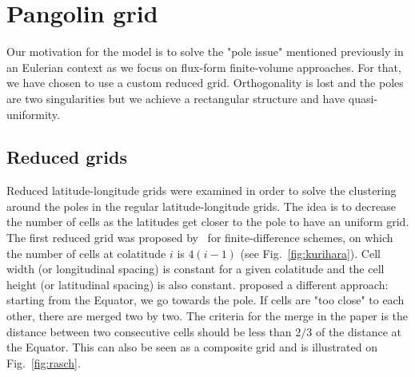 \section{Pangolin grid}
\label{subsec:pango_grid}
Our motivation for the model is to solve the "pole issue" mentioned previously
in an Eulerian context as we focus on flux-form finite-volume approaches. For
that, we have chosen to use a custom reduced grid. Orthogonality is lost and
the poles are two singularities but we achieve a rectangular structure and have
quasi-uniformity.

\subsection{Reduced grids}
Reduced latitude-longitude grids were examined in order to solve the clustering
around the poles in the regular latitude-longitude grids. The idea is to
decrease the number of cells as the latitudes get closer to the pole to
have an uniform grid. The first reduced grid was proposed by~\cite{Kurihara1965}
for finite-difference schemes, on which the number of cells at colatitude $i$ is
$4(i-1)$ (see Fig.~\ref{fig:kurihara}). Cell width (or longitudinal spacing) is
constant for a given colatitude and the cell height (or latitudinal spacing) is
also constant. \cite{Rasch1994} proposed a different approach: starting from the
Equator, we go towards the pole. If cells are "too close" to each other, there
are merged two by two. The criteria for the merge in the paper is the distance
between two consecutive cells should be less than $2/3$ of the distance at the
Equator. This can also be seen as a composite grid and is illustrated on
Fig.~\ref{fig:rasch}.

